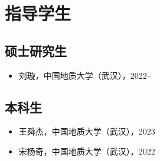 \section{指导学生}

\subsection{硕士研究生}
\begin{itemize}
\item 刘璇，中国地质大学（武汉），2022--
\end{itemize}

\subsection{本科生}
\begin{itemize}
\item 王舜杰，中国地质大学（武汉），2023
\item 宋杨奇，中国地质大学（武汉），2022
\end{itemize}
